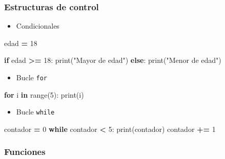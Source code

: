 \documentclass[
]{book}
\newenvironment{Shaded}{\begin{snugshade}}{\end{snugshade}}
\newcommand{\BuiltInTok}[1]{#1}
\newcommand{\ControlFlowTok}[1]{\textcolor[rgb]{0.13,0.29,0.53}{\textbf{#1}}}
\newcommand{\DecValTok}[1]{\textcolor[rgb]{0.00,0.00,0.81}{#1}}
\newcommand{\KeywordTok}[1]{\textcolor[rgb]{0.13,0.29,0.53}{\textbf{#1}}}
\newcommand{\NormalTok}[1]{#1}
\newcommand{\OperatorTok}[1]{\textcolor[rgb]{0.81,0.36,0.00}{\textbf{#1}}}
\newcommand{\StringTok}[1]{\textcolor[rgb]{0.31,0.60,0.02}{#1}}
\providecommand{\tightlist}{%
  \setlength{\itemsep}{0pt}\setlength{\parskip}{0pt}}
\theoremstyle{break}
\theoremstyle{nonumberplain}
\begin{document}
\subsubsection{Estructuras de control}\label{estructuras-de-control}

\begin{itemize}
\tightlist
\item
  Condicionales
\end{itemize}

\begin{Shaded}
\begin{Highlighting}[]
\NormalTok{edad }\OperatorTok{=} \DecValTok{18}

\ControlFlowTok{if}\NormalTok{ edad }\OperatorTok{\textgreater{}=} \DecValTok{18}\NormalTok{:}
    \BuiltInTok{print}\NormalTok{(}\StringTok{"Mayor de edad"}\NormalTok{)}
\ControlFlowTok{else}\NormalTok{:}
    \BuiltInTok{print}\NormalTok{(}\StringTok{"Menor de edad"}\NormalTok{)}
\end{Highlighting}
\end{Shaded}

\begin{itemize}
\tightlist
\item
  Bucle \texttt{for}
\end{itemize}

\begin{Shaded}
\begin{Highlighting}[]
\ControlFlowTok{for}\NormalTok{ i }\KeywordTok{in} \BuiltInTok{range}\NormalTok{(}\DecValTok{5}\NormalTok{):}
    \BuiltInTok{print}\NormalTok{(i)}
\end{Highlighting}
\end{Shaded}

\begin{itemize}
\tightlist
\item
  Bucle \texttt{while}
\end{itemize}

\begin{Shaded}
\begin{Highlighting}[]
\NormalTok{contador }\OperatorTok{=} \DecValTok{0}
\ControlFlowTok{while}\NormalTok{ contador }\OperatorTok{\textless{}} \DecValTok{5}\NormalTok{:}
    \BuiltInTok{print}\NormalTok{(contador)}
\NormalTok{    contador }\OperatorTok{+=} \DecValTok{1}
\end{Highlighting}
\end{Shaded}

\subsubsection{Funciones}\label{funciones}
\end{document}

